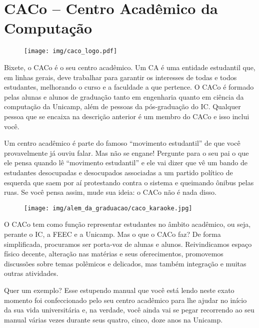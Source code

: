 
\section{CACo -- Centro Acadêmico da Computação}

\begin{figure}[H]
  \centering
  \texttt{[image: img/caco\_logo.pdf]}
\end{figure}

Bixete, o CACo é o seu centro acadêmico. Um CA é uma entidade estudantil que,
em linhas gerais, deve trabalhar para garantir os interesses de todas e todos
estudantes, melhorando o curso e a faculdade a que pertence. O CACo é formado
pelas alunas e alunos de graduação tanto em engenharia quanto em ciência da
computação da Unicamp, além de pessoas da pós-graduação do IC. Qualquer pessoa
que se encaixa na descrição anterior é um membro do CACo e isso inclui você.

Um centro acadêmico é parte do famoso ``movimento estudantil'' de que você
provavelmente já ouviu falar. Mas não se engane! Pergunte para o seu pai o que
ele pensa quando lê ``movimento estudantil'' e ele vai dizer que vê um bando de
estudantes desocupadas e desocupados associadas a um partido político de
esquerda que saem por aí protestando contra o sistema e queimando ônibus pelas
ruas. Se você pensa assim, mude sua ideia: o CACo não é nada disso.

\begin{figure}[H]
  \centering
  \texttt{[image: img/alem\_da\_graduacao/caco\_karaoke.jpg]}
\end{figure}

O CACo tem como função representar estudantes no âmbito acadêmico, ou seja,
perante o IC, a FEEC e a Unicamp. Mas o que o CACo faz? De forma simplificada,
procuramos ser porta-voz de alunas e alunos. Reivindicamos espaço físico
decente, alteração nas matérias e seus oferecimentos, promovemos discussões
sobre temas polêmicos e delicados, mas também integração e muitas outras
atividades.

Quer um exemplo? Esse estupendo manual que você está lendo neste exato momento
foi confeccionado pelo seu centro acadêmico para lhe ajudar no início da sua
vida universitária e, na verdade, você ainda vai se pegar recorrendo ao seu
manual várias vezes durante seus quatro, cinco, doze anos na Unicamp.

